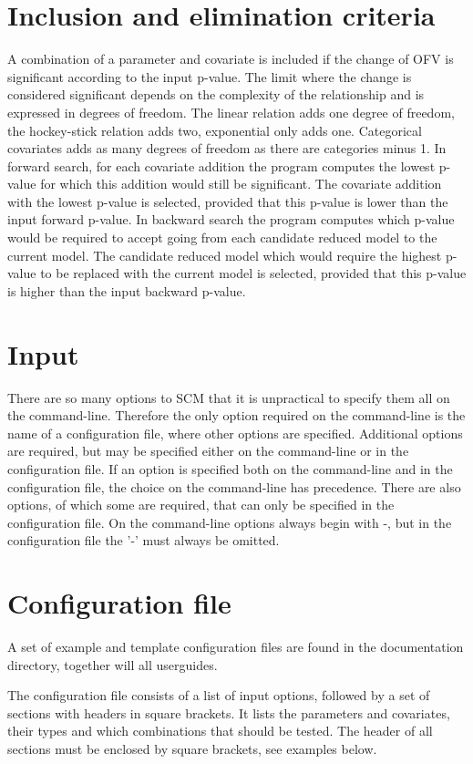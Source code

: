 \section{Inclusion and elimination criteria}
A combination of a parameter and covariate is included if the change of OFV is significant according to the input 
p-value. The limit where the change is considered significant depends on the complexity of the relationship and 
is expressed in degrees of freedom. The linear relation adds one degree of freedom, the hockey-stick relation adds two, exponential only adds one. Categorical covariates adds as many degrees of freedom as there are categories minus 1. In forward search, for each covariate addition the program computes the lowest p-value for which this addition would still be significant. The covariate addition with the lowest p-value is selected, provided that this p-value is lower than the input forward p-value. In backward search the program computes which p-value would be required to accept going from each candidate reduced model to the current model. The candidate reduced model which would require the highest p-value to be replaced with the current model is selected, provided that this p-value is higher than the input backward p-value. 

\section{Input}
There are so many options to SCM that it is unpractical to specify them all on the command-line. Therefore 
the only option required on the command-line is the name of a configuration file, where other options are 
specified. 
Additional options are required, but may be specified either on the command-line or in the configuration file. 
If an option is specified both on the command-line and in the configuration file, the choice on the command-line 
has precedence. There are also options, of which some are required, that can only be specified in the 
configuration file. 
On the command-line options always begin with -, but in the configuration file the '-' must always be omitted. 

\section{Configuration file}
A set of example and template configuration files are found in the documentation directory, together will all 
userguides.

The configuration file consists of a list of input options, followed by a set of sections with headers in square brackets. It lists the parameters and covariates, their types and which combinations that should be tested. The header of all sections must be enclosed by square brackets, see examples below. 


